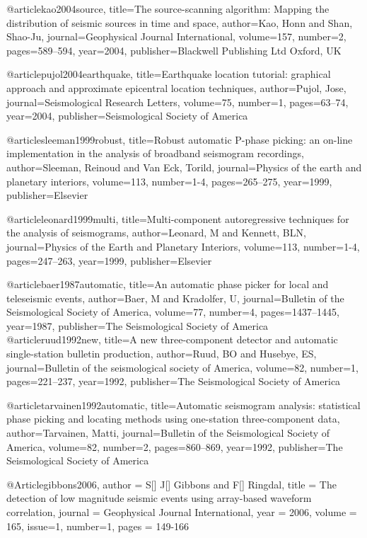 @article{kao2004source,
  title={The source-scanning algorithm: Mapping the distribution of seismic sources in time and space},
  author={Kao, Honn and Shan, Shao-Ju},
  journal={Geophysical Journal International},
  volume={157},
  number={2},
  pages={589--594},
  year={2004},
  publisher={Blackwell Publishing Ltd Oxford, UK}
}

@article{pujol2004earthquake,
  title={Earthquake location tutorial: graphical approach and approximate epicentral location techniques},
  author={Pujol, Jose},
  journal={Seismological Research Letters},
  volume={75},
  number={1},
  pages={63--74},
  year={2004},
  publisher={Seismological Society of America}
}


@article{sleeman1999robust,
  title={Robust automatic P-phase picking: an on-line implementation in the analysis of broadband seismogram recordings},
  author={Sleeman, Reinoud and Van Eck, Torild},
  journal={Physics of the earth and planetary interiors},
  volume={113},
  number={1-4},
  pages={265--275},
  year={1999},
  publisher={Elsevier}
}

@article{leonard1999multi,
  title={Multi-component autoregressive techniques for the analysis of seismograms},
  author={Leonard, M and Kennett, BLN},
  journal={Physics of the Earth and Planetary Interiors},
  volume={113},
  number={1-4},
  pages={247--263},
  year={1999},
  publisher={Elsevier}
}

@article{baer1987automatic,
  title={An automatic phase picker for local and teleseismic events},
  author={Baer, M and Kradolfer, U},
  journal={Bulletin of the Seismological Society of America},
  volume={77},
  number={4},
  pages={1437--1445},
  year={1987},
  publisher={The Seismological Society of America}
}
@article{ruud1992new,
  title={A new three-component detector and automatic single-station bulletin production},
  author={Ruud, BO and Husebye, ES},
  journal={Bulletin of the seismological society of America},
  volume={82},
  number={1},
  pages={221--237},
  year={1992},
  publisher={The Seismological Society of America}
}

@article{tarvainen1992automatic,
  title={Automatic seismogram analysis: statistical phase picking and locating methods using one-station three-component data},
  author={Tarvainen, Matti},
  journal={Bulletin of the Seismological Society of America},
  volume={82},
  number={2},
  pages={860--869},
  year={1992},
  publisher={The Seismological Society of America}
}


  @Article{gibbons2006,
  author = 	 {S[] J[] Gibbons and F[] Ringdal},
  title = 	 {The detection of low magnitude seismic events using array-based waveform correlation},
  journal = 	 {Geophysical Journal International},
  year = 	 2006,
  volume = 	 165,
  issue=1,
  number=1,
  pages = 	 {149-166}}
  
